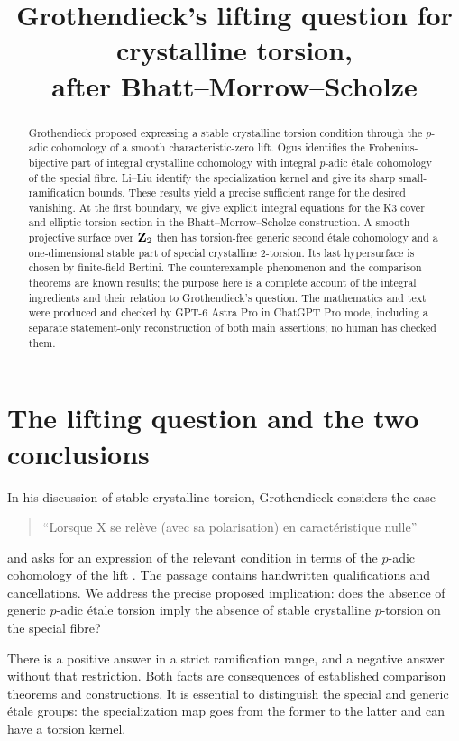 \documentclass[11pt]{article}
\title{Grothendieck's lifting question for crystalline torsion,\\
after Bhatt--Morrow--Scholze}
\author{}\date{}
\theoremstyle{definition}\newtheorem{definition}[theorem]{Definition}
\theoremstyle{remark}\newtheorem{remark}[theorem]{Remark}
\begin{document}
\maketitle
\begin{abstract}
Grothendieck proposed expressing a stable crystalline torsion condition through the $p$-adic cohomology of a smooth characteristic-zero lift. Ogus identifies the Frobenius-bijective part of integral crystalline cohomology with integral $p$-adic \'etale cohomology of the special fibre. Li--Liu identify the specialization kernel and give its sharp small-ramification bounds. These results yield a precise sufficient range for the desired vanishing. At the first boundary, we give explicit integral equations for the K3 cover and elliptic torsion section in the Bhatt--Morrow--Scholze construction. A smooth projective surface over $\mathbf Z_2$ then has torsion-free generic second \'etale cohomology and a one-dimensional stable part of special crystalline $2$-torsion. Its last hypersurface is chosen by finite-field Bertini. The counterexample phenomenon and the comparison theorems are known results; the purpose here is a complete account of the integral ingredients and their relation to Grothendieck's question. The mathematics and text were produced and checked by GPT-6 Astra Pro in ChatGPT Pro mode, including a separate statement-only reconstruction of both main assertions; no human has checked them.
\end{abstract}

\section{The lifting question and the two conclusions}

In his discussion of stable crystalline torsion, Grothendieck considers the case
\begin{quote}
``Lorsque X se rel\`eve (avec sa polarisation) en caract\'eristique nulle''
\end{quote}
and asks for an expression of the relevant condition in terms of the $p$-adic cohomology of the lift \citep[\S8.5.10, archive sheet~9, scan image~10]{Grothendieck}. The passage contains handwritten qualifications and cancellations. We address the precise proposed implication: does the absence of generic $p$-adic \'etale torsion imply the absence of stable crystalline $p$-torsion on the special fibre?

There is a positive answer in a strict ramification range, and a negative answer without that restriction. Both facts are consequences of established comparison theorems and constructions. It is essential to distinguish the special and generic \'etale groups: the specialization map goes from the former to the latter and can have a torsion kernel.
\end{document}
